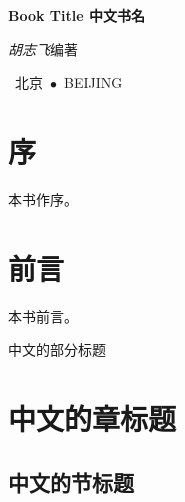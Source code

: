 \documentclass[a4paper,twoside]{ctexbook}
\makeatletter
\renewcommand\part{%
  \if@openright
    \cleardoublepage
  \else
    \clearpage
  \fi
  \thispagestyle{empty}%
  \if@twocolumn
    \onecolumn
    \@tempswatrue
  \else
    \@tempswafalse
  \fi
  \null\vfil
  \secdef\@part\@spart
}
\makeatother
\begin{document}
\begin{titlepage}
  \centering
  \vspace*{20ex}
  { \textbf{Book Title 中文书名} \par}
  \vspace{10ex}
  { \textit{胡志飞}\quad{}编著 \par}
  \vfill
  {\ 北京\ $\bullet$\ BEIJING}
\end{titlepage}
\thispagestyle{empty}


\frontmatter

\chapter*{序}

本书作序。



\chapter*{前言}

本书前言。


{
  \hypersetup{hidelinks}
  \tableofcontents
}



\mainmatter


\part{中文的部分标题}

\chapter{中文的章标题}

\hfill
\begin{minipage}[H]{.65\linewidth}
{
  \hypersetup{hidelinks}
  \startcontents[chapters]
}
\end{minipage}
\hspace{1em}

\vspace{10ex}

\lipsum[3]

\clearpage

\section{中文的节标题}
\end{document}
